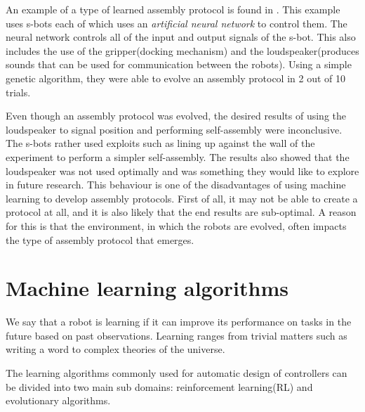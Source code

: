 An example of a type of learned assembly protocol is found in \cite{trianni_evolving_2004}. 
This example uses s-bots each of which uses an \emph{artificial neural network} to control them. 
The neural network controls all of the input and output signals of the s-bot.
This also includes the use of the gripper(docking mechanism) and the loudspeaker(produces sounds that can be used for communication between the robots).
Using a simple genetic algorithm, they were able to evolve an assembly protocol in 2 out of 10 trials.

Even though an assembly protocol was evolved, the desired results of using the loudspeaker to signal position and performing self-assembly were inconclusive.
The s-bots rather used exploits such as lining up against the wall of the experiment to perform a simpler self-assembly.
The results also showed that the loudspeaker was not used optimally and was something they would like to explore in future research.
This behaviour is one of the disadvantages of using machine learning to develop assembly protocols.
First of all, it may not be able to create a protocol at all, and it is also likely that the end results are sub-optimal. 
A reason for this is that the environment, in which the robots are evolved, often impacts the type of assembly protocol that emerges.

\section{Machine learning algorithms}
\label{sec:learning}
We say that a robot is learning if it can improve its performance on tasks in the future based on past observations.
Learning ranges from trivial matters such as writing a word to complex theories of the universe.

The learning algorithms commonly used for automatic design of controllers can be divided into two main sub domains: reinforcement learning(RL) and evolutionary algorithms\cite{brambilla_swarm_2013}.

